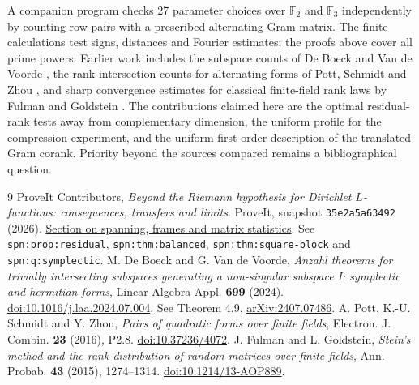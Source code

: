 \documentclass[11pt]{article}
\newcommand{\src}{https://github.com/VladimirReshetnikov/ProveIt/blob/35e2a5a634924e57ac6b77bd73a28570dd1a362b/Analysis/GeneralizedRiemannHypothesis/Article/sections/spn.tex}
\begin{document}
A companion program checks 27 parameter choices over $\mathbb F_2$ and $\mathbb F_3$ independently by counting row pairs with a prescribed alternating Gram matrix. The finite calculations test signs, distances and Fourier estimates; the proofs above cover all prime powers. Earlier work includes the subspace counts of De Boeck and Van de Voorde \cite{anzahl}, the rank-intersection counts for alternating forms of Pott, Schmidt and Zhou \cite{pott}, and sharp convergence estimates for classical finite-field rank laws by Fulman and Goldstein \cite{stein}. The contributions claimed here are the optimal residual-rank tests away from complementary dimension, the uniform profile for the compression experiment, and the uniform first-order description of the translated Gram corank. Priority beyond the sources compared remains a bibliographical question.

\begin{thebibliography}{9}
 ProveIt Contributors, \emph{Beyond the Riemann hypothesis for Dirichlet $L$-functions: consequences, transfers and limits}. ProveIt, snapshot \texttt{35e2a5a63492} (2026). \href{\src}{Section on spanning, frames and matrix statistics}. See \texttt{spn:prop:residual}, \texttt{spn:thm:balanced}, \texttt{spn:thm:square-block} and \texttt{spn:q:symplectic}.
 M. De Boeck and G. Van de Voorde, \emph{Anzahl theorems for trivially intersecting subspaces generating a non-singular subspace I: symplectic and hermitian forms}, Linear Algebra Appl. \textbf{699} (2024). \href{https://doi.org/10.1016/j.laa.2024.07.004}{doi:10.1016/j.laa.2024.07.004}. See Theorem 4.9, \href{https://arxiv.org/abs/2407.07486}{arXiv:2407.07486}.
 A. Pott, K.-U. Schmidt and Y. Zhou, \emph{Pairs of quadratic forms over finite fields}, Electron. J. Combin. \textbf{23} (2016), P2.8. \href{https://doi.org/10.37236/4072}{doi:10.37236/4072}.
 J. Fulman and L. Goldstein, \emph{Stein's method and the rank distribution of random matrices over finite fields}, Ann. Probab. \textbf{43} (2015), 1274--1314. \href{https://doi.org/10.1214/13-AOP889}{doi:10.1214/13-AOP889}.
\end{thebibliography}
\end{document}
